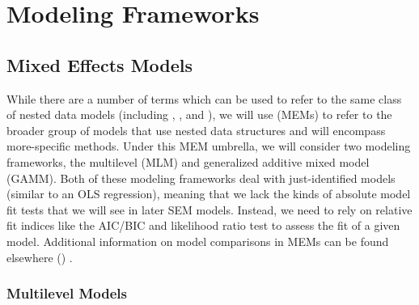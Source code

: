 \documentclass[11pt]{article}
\begin{document}
\section{Modeling Frameworks}
\subsection{Mixed Effects Models} \label{mems}

While there are a number of terms which can be used to refer to the same class of nested data models (including , , and ), we will use  (MEMs) to refer to the broader group of models that use nested data structures and will encompass more-specific methods. Under this MEM umbrella, we will consider two modeling frameworks, the multilevel (MLM) and generalized additive mixed model (GAMM). Both of these modeling frameworks deal with just-identified models (similar to an OLS regression), meaning that we lack the kinds of absolute model fit tests that we will see in later SEM models. Instead, we need to rely on relative fit indices like the AIC/BIC and likelihood ratio test to assess the fit of a given model. Additional information on model comparisons in MEMs can be found elsewhere (\cite{hamaker_model_2014,pu_selecting_2006,rights_new_2020,stram_variance_1994,vong_rapid_2012}) .

\subsubsection{Multilevel Models} \label{mlms}
\end{document}
